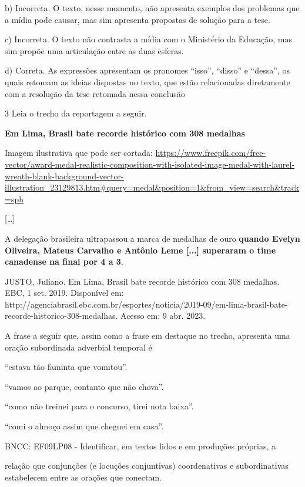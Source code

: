 {\begin{itemize}
b) Incorreta. O texto, nesse momento, não apresenta exemplos dos
problemas que a mídia pode causar, mas sim apresenta propostas de
solução para a tese.

c) Incorreta. O texto não contrasta a mídia com o Ministério da
Educação, mas sim propõe uma articulação entre as duas esferas.

d) Correta. As expressões apresentam os pronomes ``isso'', ``disso'' e
``dessa'', os quais retomam as ideias dispostas no texto, que estão
relacionadas diretamente com a resolução da tese retomada nessa
conclusão

\num{3} Leia o trecho da reportagem a seguir.

\textbf{Em Lima, Brasil bate recorde histórico com 308 medalhas}

Imagem ilustrativa que pode ser cortada:
\url{https://www.freepik.com/free-vector/award-medal-realistic-composition-with-isolated-image-medal-with-laurel-wreath-blank-background-vector-illustration_23129813.htm\#query=medal\&position=1\&from_view=search\&track=sph}

{[}\ldots{}{]}

A delegação brasileira ultrapassou a marca de medalhas de ouro
\textbf{quando Evelyn Oliveira, Mateus Carvalho e Antônio Leme {[}...{]}
superaram o time canadense na final por 4 a 3}.

JUSTO, Juliano. Em Lima, Brasil bate recorde histórico com 308 medalhas.
EBC, 1 set. 2019. Disponível em:
http://agenciabrasil.ebc.com.br/esportes/noticia/2019-09/em-lima-brasil-bate-recorde-historico-308-medalhas.
Acesso em: 9 abr. 2023.

A frase a seguir que, assim como a frase em destaque no trecho,
apresenta uma oração subordinada adverbial temporal é

\begin{escolha}
\item ``estava tão faminta que vomitou''.

\item ``vamos ao parque, contanto que não chova''.

\item ``como não treinei para o concurso, tirei nota baixa''.

\item ``comi o almoço assim que cheguei em casa''.

\end{escolha}BNCC: EF09LP08 - Identificar, em textos lidos e em produções próprias, a

relação que conjunções (e locuções conjuntivas) coordenativas e
subordinativas estabelecem entre as orações que conectam.


\end{itemize}}
